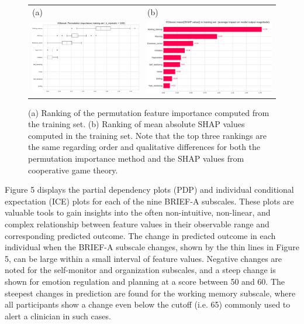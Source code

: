 \documentclass[jcm,article,submit,pdftex,moreauthors]{Definitions/mdpi}
\begin{document}
\begin{figure}[H]
\begin{tabular}{ll}
(a) & (b) \\
\includegraphics[width=6.0cm]{Figs/XGboost_BRIEF_permutation_feature_importance.pdf} & 
\includegraphics[width=7.0cm]{Figs/XGboost_BRIEF_mean_SHAP_value.pdf}
\end{tabular}
\caption{(a) Ranking of the permutation feature importance computed from the training set. (b) Ranking of mean absolute SHAP values computed in the training set. Note that the top three rankings are the same regarding order and qualitative differences for both the permutation importance method and the SHAP values from cooperative game theory.}
\end{figure} 


Figure 5 displays the partial dependency plots (PDP) and individual conditional expectation (ICE) plots for each of the nine BRIEF-A subscales. These plots are valuable tools to gain insights into the often non-intuitive, non-linear, and complex relationship between feature values in their observable range and corresponding predicted outcome.
The change in predicted outcome in each individual when the BRIEF-A subscale changes, shown by the thin lines in Figure 5, can be large within a small interval of feature values.
Negative changes are noted for the self-monitor and organization subscales, and a steep change is shown for emotion regulation and planning at a score between 50 and 60. The steepest changes in prediction are found for the working memory subscale, where all participants show a change even below the cutoff (i.e. 65) commonly used to alert a clinician in such cases.
\end{document}
